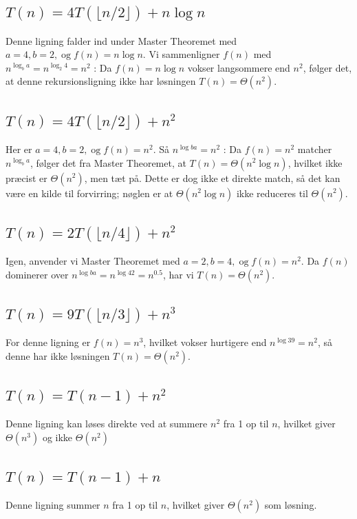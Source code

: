 \documentclass{article}
\begin{document}
\subsection{$T(n)=4 T(\lfloor n / 2\rfloor)+n \log n$}
Denne ligning falder ind under Master Theoremet med $a=4, b=2, \operatorname{og} f(n)=n \log n$. Vi sammenligner $f(n)$ med $n^{\log _b a}=n^{\log _2 4}=n^2$ : Da $f(n)=n \log n$ vokser langsommere end $n^2$, følger det, at denne rekursionsligning ikke har løsningen $T(n)=\Theta\left(n^2\right)$.

\subsection{$T(n)=4 T(\lfloor n / 2\rfloor)+n^2$}
Her er $a=4, b=2, \operatorname{og} f(n)=n^2$. Så $n^{\log b a}=n^2$ :
Da $f(n)=n^2$ matcher $n^{\log _b a}$, følger det fra Master Theoremet, at $T(n)=\Theta\left(n^2 \log n\right)$, hvilket ikke præcist er $\Theta\left(n^2\right)$, men tæt på. Dette er dog ikke et direkte match, så det kan være en kilde til forvirring; nøglen er at $\Theta\left(n^2 \log n\right)$ ikke reduceres til $\Theta\left(n^2\right)$.

\subsection{$T(n)=2 T(\lfloor n / 4\rfloor)+n^2$}
Igen, anvender vi Master Theoremet med $a=2, b=4, \operatorname{og} f(n)=n^2$. Da $f(n)$ dominerer over $n^{\log b a}=n^{\log 42}=n^{0.5}$, har vi $T(n)=\Theta\left(n^2\right)$.

\subsection{$T(n)=9 T(\lfloor n / 3\rfloor)+n^3$}
For denne ligning er $f(n)=n^3$, hvilket vokser hurtigere end $n^{\log 39}=n^2$, så denne har ikke løsningen $T(n)=\Theta\left(n^2\right)$.

\subsection{$T(n)=T(n-1)+n^2$}
Denne ligning kan løses direkte ved at summere $n^2$ fra 1 op til $n$, hvilket giver $\Theta\left(n^3\right)$ og ikke $\Theta\left(n^2\right)$

\subsection{$T(n)=T(n-1)+n$} 
Denne ligning summer $n$ fra 1 op til $n$, hvilket giver $\Theta\left(n^2\right)$ som løsning.
\end{document}

